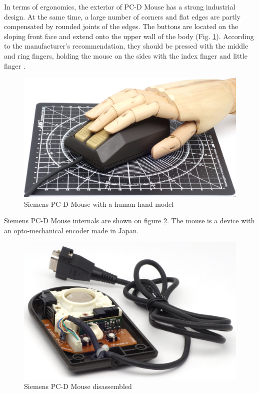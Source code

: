 \documentclass[11pt, a4paper]{article}
\begin{document}
In terms of ergonomics, the exterior of PC-D Mouse has a strong industrial design. At the same time, a large number of corners and flat edges are partly compensated by rounded joints of the edges. The buttons are located on the sloping front face and extend onto the upper wall of the body (Fig. \ref{fig:SiemensPCDHand}). According to the manufacturer's recommendation, they should be pressed with the middle and ring fingers, holding the mouse on the sides with the index finger and little finger \cite{manual}.

\begin{figure}[h]
    \centering
    \includegraphics[scale=0.45]{1985_siemens_pcd_mouse/hand_30.jpg}
    \caption{Siemens PC-D Mouse with a human hand model}
    \label{fig:SiemensPCDHand}
\end{figure}

Siemens PC-D Mouse internals are shown on figure \ref{fig:SiemensPCDInside}. The mouse is a device with an opto-mechanical encoder made in Japan.

\begin{figure}[h]
    \centering
    \includegraphics[scale=0.8]{1985_siemens_pcd_mouse/inside_30.jpg}
    \caption{Siemens PC-D Mouse disassembled}
    \label{fig:SiemensPCDInside}
\end{figure}
\end{document}
